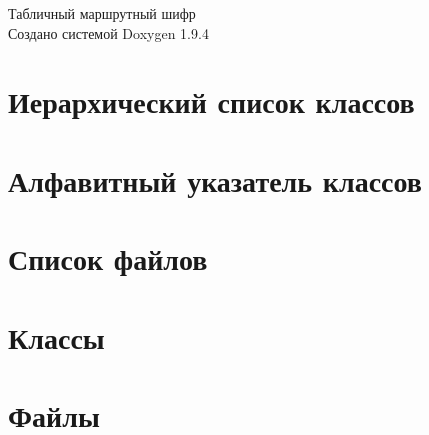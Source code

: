 \documentclass[twoside]{book}
\newcommand{\+}{\discretionary{\mbox{\scriptsize$\hookleftarrow$}}{}{}}
\newcommand{\clearemptydoublepage}{%
    \newpage{\pagestyle{empty}\cleardoublepage}%
  }
\begin{document}
  \raggedbottom
    \hypersetup{pageanchor=false,
                bookmarksnumbered=true,
                pdfencoding=unicode
               }
  \begin{titlepage}
  \vspace*{7cm}
  \begin{center}%
  {\Large Табличный маршрутный шифр}\\
  \vspace*{1cm}
  {\large Создано системой Doxygen 1.9.4}\\
  \end{center}
  \end{titlepage}
  \clearemptydoublepage
  \tableofcontents
  \clearemptydoublepage
  \hypersetup{pageanchor=true}
\chapter{Иерархический список классов}

\chapter{Алфавитный указатель классов}

\chapter{Список файлов}

\chapter{Классы}


\chapter{Файлы}




  \backmatter
  \newpage
  \clearemptydoublepage
  \printindex
\end{document}
